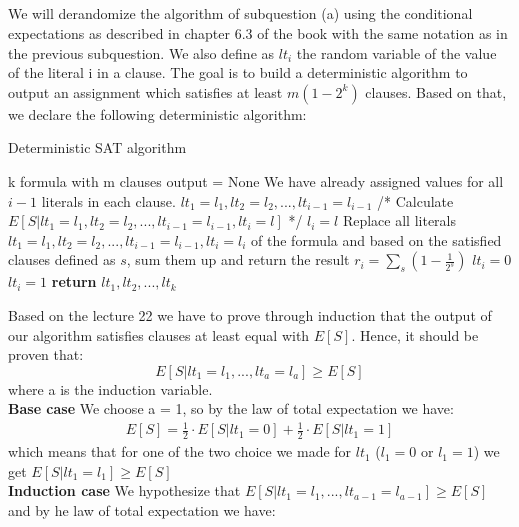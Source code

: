 \documentclass[11pt]{537homework}
\begin{document}
\subsection{}
We will derandomize the algorithm of subquestion (a) using the conditional expectations as described in chapter 6.3 of the book with the same notation as in the previous subquestion. We also define as $lt_i$ the random variable of the value of the literal i in a clause. The goal is to build a deterministic algorithm to output an assignment which satisfies at least $m(1 - 2^{k})$ clauses. Based on that, we declare the following deterministic algorithm: 
\begin{algorithm}
\caption{Deterministic SAT  algorithm}
\begin{algorithmic}
    \Require k formula with m clauses
    \State output = None 
        \State We have already assigned values for all $i-1$ literals in each clause. $lt_1 = l_1,lt_2 = l_2,...,lt_{i-1} =l_{i-1}$
        \State /* Calculate $E[S | lt_1 = l_1,lt_2 = l_2,...,lt_{i-1} =l_{i-1},lt_i = l]$ */
        \State $l_i = l$
        \State Replace all literals $lt_1 = l_1,lt_2 = l_2,...,lt_{i-1} =l_{i-1},lt_i = l_i$ of the formula and based on the satisfied clauses defined as $s$, sum them up and return the result $r_i = \sum_{s}^{} (1 - \frac{1}{2^{s}})$ 
    \EndFor
     \State $lt_i = 0$
    \Else
     \State $lt_i = 1$
    \EndIf 
    \EndFor
    \State \textbf{return} $lt_1,lt_2,...,lt_{k}$
\end{algorithmic}
\end{algorithm}
Based on the lecture 22 we have to prove through induction that the output of our algorithm satisfies clauses at least equal with $E[S]$. Hence, it should be proven
that:
\begin{equation}
    E[S | lt_1 = l_1,...,lt_a = l_a] \geq E[S]
\end{equation}
where a is the induction variable.\\
\textbf{Base case} We choose a = 1, so by the law of total expectation we have:
\begin{align*}
 E[S] = \frac{1}{2} \cdot E[S | lt_1 = 0] + \frac{1}{2} \cdot E[S | lt_1 = 1]     
\end{align*}
which means that for one of the two choice we made for $lt_1$ ($l_1 =0$ or $l_1=1$) we get $E[S | lt_1 = l_1] \geq E[S]$\\
\textbf{Induction case} We hypothesize that $E[S | lt_1 = l_1,...,lt_{a-1} = l_{a-1}] \geq E[S]$ and by he law of total expectation we have:
\end{document}
